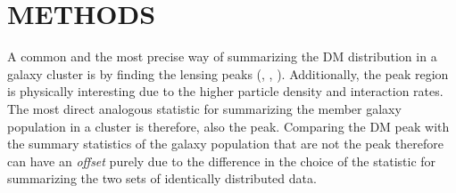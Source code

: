 \section{METHODS}\label{sec:methods}
A common and the most precise way of summarizing the DM distribution in a
galaxy cluster is by finding the lensing peaks 
(\citealt{Medezinski2013}, \citealt{Markevitch2004}, \citealt{Zitrin13}).
Additionally, the peak region is physically 
interesting due to the higher particle density and interaction rates. 
The most direct analogous statistic for summarizing the member galaxy
population in a cluster is therefore, also the peak. 
Comparing the DM peak with the summary statistics of the galaxy population that
are not the peak therefore can have an {\it offset} purely due to the difference in
the choice of the statistic for summarizing the two sets of identically
distributed data. 

